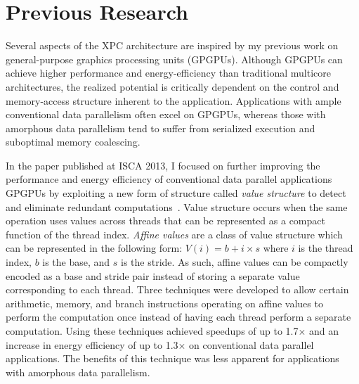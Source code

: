 
\section{Previous Research}
\label{sec-background}

Several aspects of the XPC architecture are inspired by my previous work
on general-purpose graphics processing units (GPGPUs). Although GPGPUs
can achieve higher performance and energy-efficiency than traditional
multicore architectures, the realized potential is critically dependent
on the control and memory-access structure inherent to the
application. Applications with ample conventional data parallelism often
excel on GPGPUs, whereas those with amorphous data parallelism tend to
suffer from serialized execution and suboptimal memory coalescing.

In the paper published at ISCA 2013, I focused on further improving the
performance and energy efficiency of conventional data parallel
applications GPGPUs by exploiting a new form of structure called
\emph{value structure} to detect and eliminate redundant
computations~\cite{kim-simt-vstruct-isca2013}. Value structure occurs
when the same operation uses values across threads that can be
represented as a compact function of the thread index. \emph{Affine
  values} are a class of value structure which can be represented in the
following form: $V(i) = b + i \times s$ where $i$ is the thread index,
$b$ is the base, and $s$ is the stride. As such, affine values can be
compactly encoded as a base and stride pair instead of storing a separate
value corresponding to each thread. Three techniques were developed to
allow certain arithmetic, memory, and branch instructions operating on
affine values to perform the computation once instead of having each
thread perform a separate computation. Using these techniques achieved
speedups of up to 1.7$\times$ and an increase in energy efficiency of up
to 1.3$\times$ on conventional data parallel applications. The benefits
of this technique was less apparent for applications with amorphous data
parallelism.

